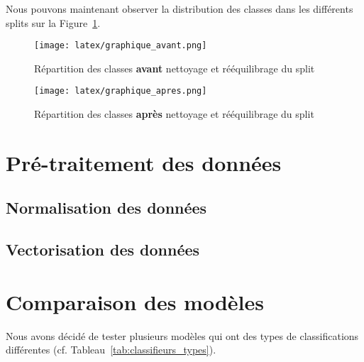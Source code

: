 \documentclass[11pt]{article}
\begin{document}
Nous pouvons maintenant observer la distribution des classes dans les différents splits sur la Figure~\ref{fig:graph_avant}.

\begin{figure}[H]
  \texttt{[image: latex/graphique\_avant.png]}
  \caption{Répartition des classes \textbf{avant} nettoyage et rééquilibrage du split}
  \label{fig:graph_avant} %
\end{figure}



\begin{figure}[H]
  \texttt{[image: latex/graphique\_apres.png]}
  \caption{Répartition des classes \textbf{après} nettoyage et rééquilibrage du split}
  \label{fig:graph_apres} %
\end{figure}


\section{Pré-traitement des données}

\subsection{Normalisation des données}

\subsection{Vectorisation des données}

\section{Comparaison des modèles}
Nous avons décidé de tester plusieurs modèles qui ont des types de classifications différentes (cf. Tableau~\ref{tab:classifieurs_types}).
\end{document}
